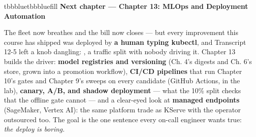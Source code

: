 \begin{calloutbox}{tbbblue}{tbbbluefill}
{\normalsize\bfseries\color{tbbblue}Next chapter — Chapter 13: MLOps and Deployment Automation}\par\vspace{3pt}
The fleet now breathes and the bill now closes — but every improvement this course has shipped was deployed by \textbf{a human typing kubectl}, and Transcript 12-5 left a knob dangling: , a traffic split with nobody driving it. Chapter 13 builds the driver: \textbf{model registries and versioning} (Ch. 4's digests and Ch. 6's store, grown into a promotion workflow), \textbf{CI/CD pipelines} that run Chapter 10's gates and Chapter 9's sweeps on every candidate (GitHub Actions, in the lab), \textbf{canary, A/B, and shadow deployment} — what the 10\% split checks that the offline gate cannot — and a clear-eyed look at \textbf{managed endpoints} (SageMaker, Vertex AI): the same platform trade as KServe with the operator outsourced too. The goal is the one sentence every on-call engineer wants true: \textit{the deploy is boring.}
\end{calloutbox}
